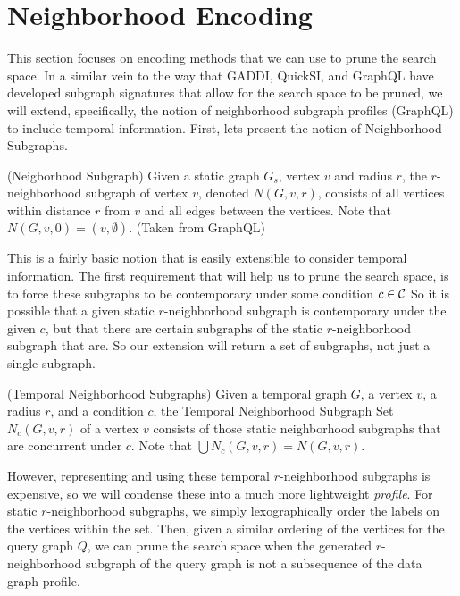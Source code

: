 \section{Neighborhood Encoding}

This section focuses on encoding methods that we can use to prune the search
space. In a similar vein to the way that GADDI, QuickSI, and GraphQL have
developed subgraph signatures that allow for the search space to be pruned, we
will extend, specifically, the notion of neighborhood subgraph profiles
(GraphQL) to include temporal information. First, lets present the notion of
Neighborhood Subgraphs.

\begin{defn}
  (Neigborhood Subgraph) Given a static graph $G_s$, vertex $v$ and radius $r$,
  the $r$-neighborhood subgraph of vertex $v$, denoted $N(G,v,r)$, consists of
  all vertices within distance $r$ from $v$ and all edges between the
  vertices. Note that $N(G,v,0) = ({v}, \emptyset)$. (Taken from GraphQL)
\end{defn}

This is a fairly basic notion that is easily extensible to consider temporal
information. The first requirement that will help us to prune the search space,
is to force these subgraphs to be contemporary under some condition $c \in \mathcal{C}$
So it is possible that a given static $r$-neighborhood subgraph is contemporary under the
given $c$, but that there are certain subgraphs of the static $r$-neighborhood
subgraph that are.  So our extension will return a set of subgraphs, not just a
single subgraph.

\begin{defn}
  (Temporal Neighborhood Subgraphs) Given a temporal graph $G$, a vertex $v$, a
  radius $r$, and a condition $c$, the Temporal Neighborhood Subgraph Set
  $N_c(G,v,r)$ of a vertex $v$ consists of those static neighborhood subgraphs
  that are concurrent under $c$. Note that $\displaystyle\bigcup N_c(G,v,r) =
  N(G,v,r)$.
\end{defn}

However, representing and using these temporal $r$-neighborhood subgraphs is
expensive, so we will condense these into a much more lightweight
\textit{profile}. For static $r$-neighborhood subgraphs, we simply
lexographically order the labels on the vertices within the set. Then, given a
similar ordering of the vertices for the query graph $Q$, we can prune the
search space when the generated $r$-neighborhood subgraph of the query graph is
not a subsequence of the data graph profile.

